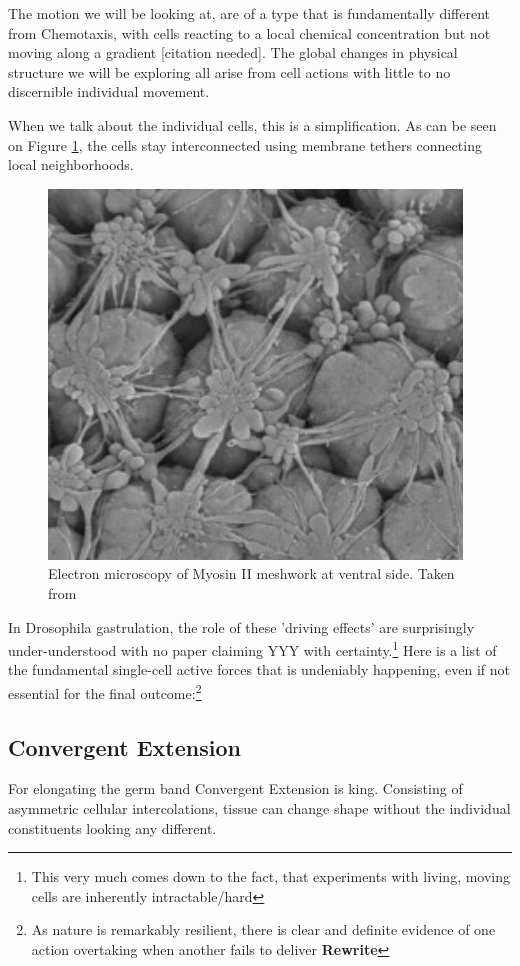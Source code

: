 The motion we will be looking at, are of a type that is fundamentally different from Chemotaxis, with cells reacting to a local chemical concentration but not moving along a gradient [citation needed]. The global changes in physical structure we will be exploring all arise from cell actions with little to no discernible individual movement.


When we talk about the individual cells, this is a simplification. As can be seen on Figure \ref{fig:mysosinMeshwork}, the cells stay interconnected using membrane tethers connecting local neighborhoods. 

\begin{figure}[H]
    \centering
    \includegraphics[width=0.6\linewidth]{chapters/Theory/figures/EM_constricting_proteins.png}
    \caption{Electron microscopy of Myosin II meshwork at ventral side. Taken from \cite{martin2010integration}}
    \label{fig:mysosinMeshwork}
\end{figure}

In Drosophila gastrulation, the role of these 'driving effects' are surprisingly under-understood with no paper claiming YYY with certainty.\footnote{This very much comes down to the fact, that experiments with living, moving cells are inherently intractable/hard} Here is a list of the fundamental single-cell active forces that is undeniably happening, even if not essential for the final outcome:\footnote{As nature is remarkably resilient, there is clear and definite evidence of one action overtaking when another fails to deliver \cite{butler2009cell} \textbf{Rewrite}} 

\subsection{Convergent Extension}
For elongating the germ band Convergent Extension is king. Consisting of asymmetric cellular intercolations, tissue can change shape without the individual constituents looking any different.  


